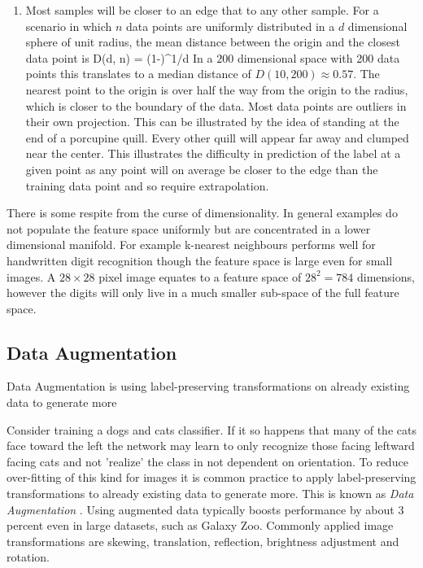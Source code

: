 \begin{enumerate}
\item Most samples will be closer to an edge that to any other sample.
For a scenario in which $n$ data points are uniformly distributed in a $d$ dimensional sphere of unit radius, the mean distance between the origin and the closest data point is
\be
D(d, n) = \left(1-\right)^{1/d}
\ee
In a $200$ dimensional space with 200 data points this translates to a median distance of $D(10,200)\approx 0.57$.
The nearest point to the origin is over half the way from the origin to the radius, which is closer to the boundary of the data.
Most data points are outliers in their own projection.
This can be illustrated by the idea of standing at the end of a porcupine quill.
Every other quill will appear far away and clumped near the center.
This illustrates the difficulty in prediction of the label at a given point as any point will on average be closer to the edge than the training data point and so require extrapolation.

\end{enumerate}

There is some respite from the curse of dimensionality.
In general examples do not populate the feature space uniformly but are concentrated in a lower dimensional manifold.
For example k-nearest neighbours performs well for handwritten digit recognition though the feature space is large even for small images.
A $28\times 28$ pixel image equates to a feature space of $28^2 = 784$ dimensions, however the digits will only live in a much smaller sub-space of the full feature space.


\subsection{Data Augmentation}
Data Augmentation is using label-preserving transformations on already existing data to generate more 

Consider training a dogs and cats classifier.
If it so happens that many of the cats face toward the left the network may learn to only recognize those facing leftward facing cats and not 'realize' the class in not dependent on orientation.
To reduce over-fitting of this kind for images it is common practice to apply label-preserving transformations to already existing data to generate more. 
This is known as \textit{Data Augmentation}\citep{chatfield2014return} \citep{goyal2014object}\citep{krizhevsky2012imagenet}.
Using augmented data typically boosts performance by about 3 percent\citep{chatfield2015fly} even in large datasets, such as Galaxy Zoo\citep{lintott2008galaxy}\citep{goyal2014object}.
Commonly applied image transformations are skewing\citep{mo2012survey}, translation, reflection, brightness adjustment\citep{krizhevsky2012imagenet} and rotation\citep{chatfield2014return}.

